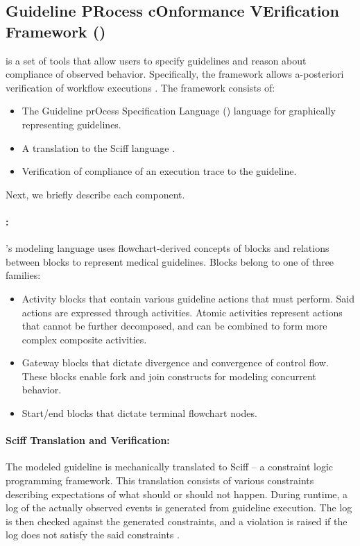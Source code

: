 \subsection{Guideline PRocess cOnformance VErification Framework (\GPROVE{})}\label{sec:gprove}

\GPROVE{} is a set of tools that allow users to specify guidelines and
reason about compliance of observed behavior. Specifically,
the framework allows a-posteriori verification of workflow executions \cite{ChesaniISMIS06}.
The \GPROVE{} framework consists of:
\begin{itemize}
  \item The Guideline prOcess Specification Language (\GOSPEL{}) language for graphically representing guidelines.
  \item A translation to the Sciff language \cite{AlbertiTOCL08}.
  \item Verification of compliance of an execution trace to the guideline.
\end{itemize}
Next, we briefly describe each component.

\paragraph{\GOSPEL{}:}

\GPROVE{}'s modeling language uses flowchart-derived concepts of
blocks and relations between blocks to represent medical guidelines. Blocks belong to one of three families:
\begin{itemize}
  \item Activity blocks that contain various guideline actions that \HCPs{} must perform.
    Said actions are expressed through activities.
    Atomic activities represent actions that cannot be further decomposed, and
    can be combined to form more complex composite activities.
  \item Gateway blocks that dictate divergence and convergence of control flow.
    These blocks enable fork and join constructs for modeling concurrent
    behavior.
  \item Start/end blocks that dictate terminal flowchart nodes.
\end{itemize}

\paragraph{Sciff Translation and Verification:}

The modeled guideline is mechanically translated to Sciff --
a constraint logic programming framework. This translation
consists of various constraints describing expectations of what
should or should not happen. During runtime,
a log of the actually observed events is generated from guideline execution.
The log is then checked against the generated constraints, and a violation is
raised if the log does not satisfy the said constraints \cite{ChesaniBook08}.

